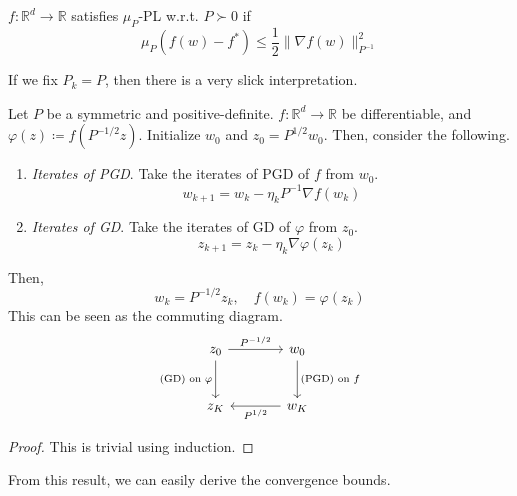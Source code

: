 	\begin{definition}[$\mu_P$-PL]
	  \label{def:mup-pl}
		$f: \mathbb{R}^d \to \mathbb{R}$ satisfies $\mu_P$-PL w.r.t. $P \succ 0$ if 
		\begin{equation}
			\mu_P (f(w) - f^\ast) \leq \frac{1}{2} \|\nabla f(w)\|_{P^{-1}}^2
		\end{equation}
	\end{definition}

	If we fix $P_k = P$, then there is a very slick interpretation. 

	\begin{lemma}
	  \label{thm:scale-change}
 
		Let $P$ be a symmetric and positive-definite. $f: \mathbb{R}^d \to \mathbb{R}$ be differentiable, and $\varphi(z) \coloneqq f(P^{-1/2} z)$. Initialize $w_0$ and $z_0 = P^{1/2} w_0$. 
		Then, consider the following. 
		\begin{enumerate}
		  \item \textit{Iterates of PGD}. Take the iterates of PGD of $f$ from $w_0$. 
				\begin{equation}
					w_{k+1} = w_k - \eta_k P^{-1} \nabla f(w_k)
				\end{equation}

			\item \textit{Iterates of GD}. Take the iterates of GD of $\varphi$ from $z_0$. 
				\begin{equation}
					z_{k+1} = z_k - \eta_k \nabla \varphi(z_k)
				\end{equation}
		\end{enumerate}
		Then, 
		\begin{equation}
			w_k = P^{-1/2} z_k, \quad f(w_k) = \varphi(z_k)
		\end{equation}
		This can be seen as the commuting diagram. 
		\begin{equation}
			\begin{tikzcd}[column sep=large, row sep=large]
			z_0 \arrow[r, "P^{-1/2}"] \arrow[d, "\text{(GD) on } \varphi"'] 
				& w_0 \arrow[d, "\text{(PGD) on } f"] \\
			z_K 
				& w_K \arrow[l, "P^{1/2}"]
			\end{tikzcd}
		\end{equation}
	\end{lemma}
	\begin{proof}
	  This is trivial using induction. 
	\end{proof}

	From this result, we can easily derive the convergence bounds. 

